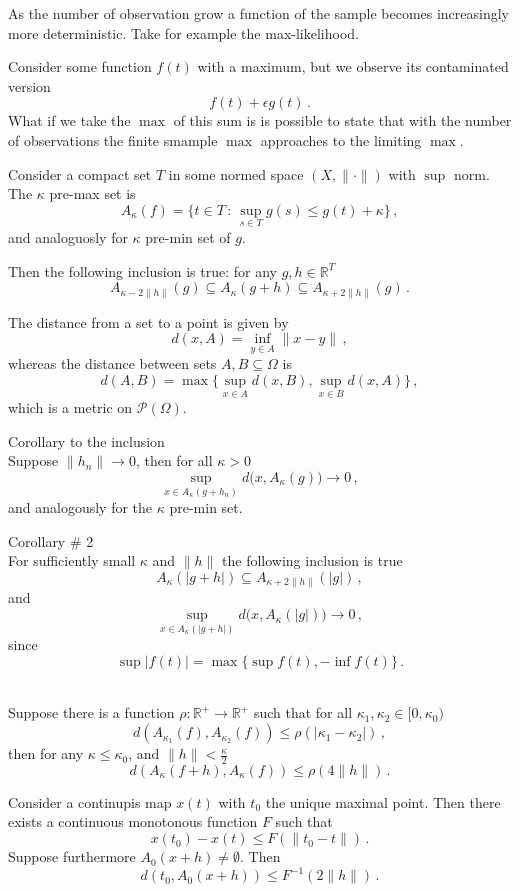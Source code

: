 \documentclass[a4paper]{article}
\newcommand{\Real}{\mathbb{R}}
\begin{document}
As the number of observation grow a function of the sample becomes increasingly
more deterministic. Take for example the max-likelihood.

Consider some function $f(t)$ with a maximum, but we observe its contaminated
version 
\[ f(t) + \epsilon g(t) \,. \]
What if we take the $\max$ of this sum is is possible to state that with the number
of observations the finite smample $\max$ approaches to the limiting $\max$.

Consider a compact set $T$ in some normed space $(X,\|\cdot\|)$ with $\sup$ norm.
The $\kappa$ pre-max set is
\[ A_\kappa(f) = \{ t\in T \,:\, \sup_{s\in T} g(s)\leq g(t) + \kappa \}\,, \]
and analoguosly for $\kappa$ pre-min set of $g$.

Then the following inclusion is true: for any $g,h\in \Real^T$
\[ A_{\kappa-2\|h\|}(g)
  \subseteq A_\kappa(g+h)
  \subseteq A_{\kappa+2\|h\|}(g) \,. \]

The distance from a set to a point is given by
\[ d(x, A) = \inf_{y\in A} \|x-y\| \,,\]
whereas the distance between sets $A,B\subseteq \Omega$ is
\[ d(A,B) = \max\bigl\{ \sup_{ x\in A } d(x,B),
                        \sup_{ x\in B } d(x, A) \bigr \}\,, \]
which is a metric on $\mathcal{P}(\Omega)$.

\noindent Corollary to the inclusion\hfill\\
Suppose $\|h_n\|\to 0$, then for all $\kappa>0$
\[ \sup_{ x\in A_\kappa(g+h_n) } d\bigl(x, A_\kappa(g)\bigr) \to 0 \,, \]
and analogously for the $\kappa$ pre-min set.

\noindent Corollary \# 2\hfill\\
For sufficiently small $\kappa$ and $\|h\|$ the following inclusion is true
\[ A_\kappa(|g+h|) \subseteq A_{\kappa+2\|h\|} (|g|) \,,\]
and 
\[ \sup_{x\in A_\kappa(|g+h|)} d\bigl( x, A_\kappa (|g|) \bigr) \to 0 \,,\]
since 
\[ \sup |f(t)| = \max\{ \sup f(t), -\inf f(t) \} \,. \]

\noindent \hfill\\
Suppose there is a function $\rho:\Real^+\to \Real^+$ such that for all
$\kappa_1,\kappa_2\in [0,\kappa_0)$
\[ d( A_{\kappa_1}(f), A_{\kappa_2}(f) ) \leq \rho( |\kappa_1-\kappa_2| )\,, \]
then for any $\kappa\leq \kappa_0$, and $\|h\| < \frac{\kappa}{2}$
\[ d( A_\kappa(f+h), A_\kappa(f) ) \leq \rho( 4\|h\| ) \,. \]

Consider a continupis map $x(t)$ with $t_0$ the unique maximal point. Then there
exists a continuous monotonous function $F$ such that 
\[ x(t_0)-x(t) \leq F( \|t_0-t\| ) \,. \]
Suppose furthermore $A_0(x+h)\neq \emptyset$. Then 
\[ d(t_0, A_0(x+h)) \leq F^{-1}(2\|h\|)\,. \]
\end{document}
